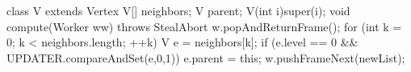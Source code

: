 class V  extends Vertex {
  V[] neighbors;
  V parent;
  V(int i){super(i);}
  void compute(Worker ww) throws StealAbort {
    w.popAndReturnFrame();
    for (int k = 0; k < neighbors.length; ++k) {
      V e = neighbors[k];
      if (e.level == 0 && 
          UPDATER.compareAndSet(e,0,1)) {
        e.parent = this;
        w.pushFrameNext(newList);
      }
    }
  }
}
        
